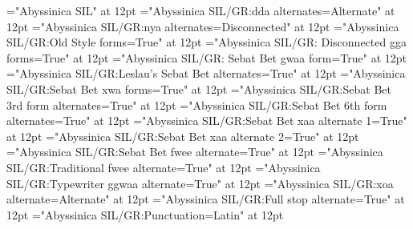 
\nopagenumbers
\parindent=0pt

\def\cv{\vskip 12pt\A \parindent=0pt}
\def\IndSS{\par\A \parindent=12pt}


\font\A="Abyssinica SIL" at 12pt
\font\Oromo="Abyssinica SIL/GR:dda alternates=Alternate" at 12pt
\font\Gumuz="Abyssinica SIL/GR:nya alternates=Disconnected" at 12pt
\font\OldStyle="Abyssinica SIL/GR:Old Style forms=True" at 12pt
\font\Disconnected="Abyssinica SIL/GR: Disconnected gga forms=True" at 12pt
\font\SBDef="Abyssinica SIL/GR: Sebat Bet gwaa form=True" at 12pt
\font\Leslau="Abyssinica SIL/GR:Leslau's Sebat Bet alternates=True" at 12pt
\font\xwa="Abyssinica SIL/GR:Sebat Bet xwa forms=True" at 12pt
\font\SBThree="Abyssinica SIL/GR:Sebat Bet 3rd form alternates=True" at 12pt
\font\SBSix="Abyssinica SIL/GR:Sebat Bet 6th form alternates=True" at 12pt
\font\xaaOne="Abyssinica SIL/GR:Sebat Bet xaa alternate 1=True" at 12pt
\font\xaaTwo="Abyssinica SIL/GR:Sebat Bet xaa alternate 2=True" at 12pt
\font\SBfwee="Abyssinica SIL/GR:Sebat Bet fwee alternate=True" at 12pt
\font\fwee="Abyssinica SIL/GR:Traditional fwee alternate=True" at 12pt
\font\ggwaa="Abyssinica SIL/GR:Typewriter ggwaa alternate=True" at 12pt
\font\xoa="Abyssinica SIL/GR:xoa alternate=Alternate" at 12pt
\font\Fullstop="Abyssinica SIL/GR:Full stop alternate=True" at 12pt
\font\Punct="Abyssinica SIL/GR:Punctuation=Latin" at 12pt


